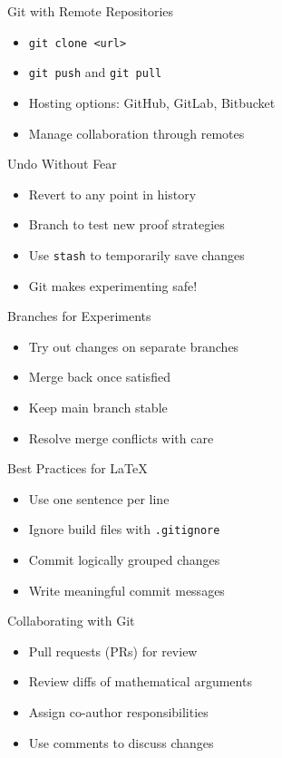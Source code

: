 \documentclass[12pt,t]{beamer}
\begin{document}
\begin{frame}{Git with Remote Repositories}
\begin{itemize}
    \item \texttt{git clone <url>}
		\pause
    \item \texttt{git push} and \texttt{git pull}
		\pause
    \item Hosting options: GitHub, GitLab, Bitbucket
		\pause
    \item Manage collaboration through remotes
\end{itemize}
\end{frame}

\begin{frame}{Undo Without Fear}
\begin{itemize}
    \item Revert to any point in history
		\pause
    \item Branch to test new proof strategies
		\pause
    \item Use \texttt{stash} to temporarily save changes
		\pause
    \item Git makes experimenting safe!
		\pause
\end{itemize}
\end{frame}

\begin{frame}{Branches for Experiments}
\begin{itemize}
    \item Try out changes on separate branches
		\pause
    \item Merge back once satisfied
		\pause
    \item Keep main branch stable
		\pause
    \item Resolve merge conflicts with care
\end{itemize}
\end{frame}

\begin{frame}{Best Practices for \LaTeX}
\begin{itemize}
    \item Use one sentence per line
		\pause
    \item Ignore build files with \texttt{.gitignore}
		\pause
    \item Commit logically grouped changes
		\pause
    \item Write meaningful commit messages
\end{itemize}
\end{frame}

\begin{frame}{Collaborating with Git}
\begin{itemize}
    \item Pull requests (PRs) for review
		\pause
    \item Review diffs of mathematical arguments
		\pause
    \item Assign co-author responsibilities
		\pause
    \item Use comments to discuss changes
\end{itemize}
\end{frame}
\end{document}
